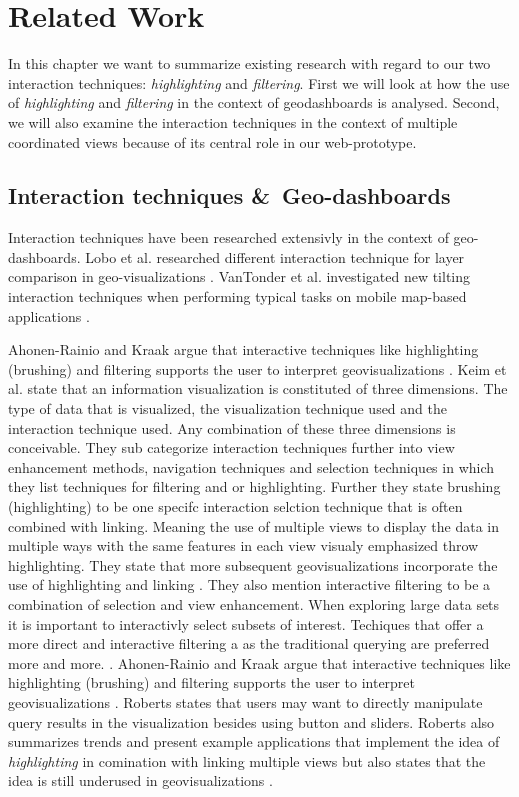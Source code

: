 \chapter{Related Work}
In this chapter we want to summarize existing research with regard to our two interaction techniques:
\textit{highlighting} and \textit{filtering}. First we will look at how the use of \textit{highlighting}
and \textit{filtering} in the context of geodashboards is analysed. Second, we will also examine the
interaction techniques in the context of multiple coordinated views because of its central role in our web-prototype.
\section{Interaction techniques \&\ Geo-dashboards}


Interaction techniques have been researched extensivly in the context of geo-dashboards.
Lobo et al. researched different interaction technique for layer comparison in geo-visualizations \citep*{Lobo.2015}.
VanTonder et al. investigated new tilting interaction techniques when performing typical tasks on mobile map-based applications \citep*{vanTonder.2011}.

Ahonen-Rainio and Kraak argue that interactive techniques like highlighting (brushing) and filtering supports the user
to interpret geovisualizations \citep*{AhonenRainio.2005}.
Keim et al. state that an information visualization is constituted of three dimensions. The type of data that is visualized, the visualization technique used
and the interaction technique used. Any combination of these three dimensions is conceivable. They sub categorize interaction techniques further into
view enhancement methods, navigation techniques and selection techniques in which they list techniques for filtering and or highlighting. Further they state
brushing (highlighting) to be one specifc interaction selction technique that is often combined with linking. Meaning the use of multiple views to display the
data in multiple ways with the same features in each view visualy emphasized throw highlighting. They state that more subsequent geovisualizations incorporate the
use of highlighting and linking \citep*{Keim.2005}. They also mention interactive filtering to be a combination of selection and view enhancement. When exploring large
data sets it is important to interactivly select subsets of interest. Techiques that offer a more direct and interactive filtering a as the traditional querying are
preferred more and more. \citep*{Keim.2005}. Ahonen-Rainio and Kraak argue that interactive techniques like highlighting (brushing) and filtering supports the user
to interpret geovisualizations \citep*{AhonenRainio.2005}. Roberts states that users may want to directly manipulate query results in the visualization besides using button
and sliders. Roberts also summarizes trends and present example applications that implement the idea of \textit{highlighting}
in comination with linking multiple views but also states that the idea is still underused in geovisualizations \citep*{Roberts.2005}.


